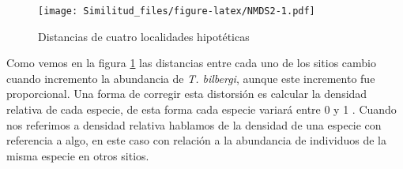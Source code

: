 \documentclass[]{book}
\newenvironment{Shaded}{\begin{snugshade}}{\end{snugshade}}
\newcommand{\KeywordTok}[1]{\textcolor[rgb]{0.13,0.29,0.53}{\textbf{{#1}}}}
\newcommand{\DataTypeTok}[1]{\textcolor[rgb]{0.13,0.29,0.53}{{#1}}}
\newcommand{\DecValTok}[1]{\textcolor[rgb]{0.00,0.00,0.81}{{#1}}}
\newcommand{\FloatTok}[1]{\textcolor[rgb]{0.00,0.00,0.81}{{#1}}}
\newcommand{\StringTok}[1]{\textcolor[rgb]{0.31,0.60,0.02}{{#1}}}
\newcommand{\NormalTok}[1]{{#1}}
\begin{document}
\begin{Shaded}
\end{Shaded}

\begin{figure}[htbp]
\centering
\texttt{[image: Similitud\_files/figure-latex/NMDS2-1.pdf]}
\caption{\label{fig:NMDS2}Distancias de cuatro localidades hipotéticas}
\end{figure}

Como vemos en la figura \ref{fig:NMDS2} las distancias entre cada uno de
los sitios cambio cuando incremento la abundancia de \emph{T. bilbergi},
aunque este incremento fue proporcional. Una forma de corregir esta
distorsión es calcular la densidad relativa de cada especie, de esta
forma cada especie variará entre 0 y 1 \citep{Stevens2009}. Cuando nos
referimos a densidad relativa hablamos de la densidad de una especie con
referencia a algo, en este caso con relación a la abundancia de
individuos de la misma especie en otros sitios.
\end{document}
